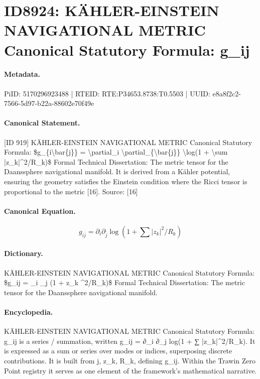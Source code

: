 \section*{ID8924: KÄHLER-EINSTEIN NAVIGATIONAL METRIC Canonical Statutory Formula: g\_ij}
\paragraph{Metadata.}
PiID: 5170296923488 | RTEID: RTE:P34653.8738:T0.5503 | UUID: e8a8f2c2-7566-5d97-b22a-88602e70f49e

\paragraph{Canonical Statement.}
[ID 919] KÄHLER-EINSTEIN NAVIGATIONAL METRIC Canonical Statutory Formula: \$g\_\{i\textbackslash{}bar\{j\}\} = \textbackslash{}partial\_i \textbackslash{}partial\_\{\textbackslash{}bar\{j\}\} \textbackslash{}log(1 + \textbackslash{}sum |z\_k|\textasciicircum{}2/R\_k)\$ Formal Technical Dissertation: The metric tensor for the Daanssphere navigational manifold. It is derived from a Kähler potential, ensuring the geometry satisfies the Einstein condition where the Ricci tensor is proportional to the metric [16]. Source: [16]

\paragraph{Canonical Equation.}
\[
g_{i\bar{j}} = \partial_i \partial_{\bar{j}} \log(1 + \sum |z_k|^2/R_k)
\]

\paragraph{Dictionary.}
KÄHLER-EINSTEIN NAVIGATIONAL METRIC Canonical Statutory Formula: \$g\_ij = \_i \_j (1 + z\_k \textasciicircum{}2/R\_k)\$ Formal Technical Dissertation: The metric tensor for the Daanssphere navigational manifold.

\paragraph{Encyclopedia.}
KÄHLER-EINSTEIN NAVIGATIONAL METRIC Canonical Statutory Formula: g\_ij is a series / summation, written g\_ij = ∂\_i ∂\_j log(1 + ∑ |z\_k|\textasciicircum{}2/R\_k). It is expressed as a sum or series over modes or indices, superposing discrete contributions. It is built from j, z\_k, R\_k, defining g\_ij. Within the Trawin Zero Point registry it serves as one element of the framework's mathematical narrative.

